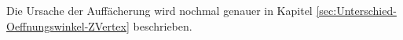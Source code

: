 \documentclass[a4paper,11pt,oneside,final,german,openbib,pdftex]{scrbook}
\begin{document}
{Die Ursache der Auff\"acherung wird nochmal genauer in Kapitel \ref{sec:Unterschied-Oeffnungswinkel-ZVertex} beschrieben.


}
\end{document}
